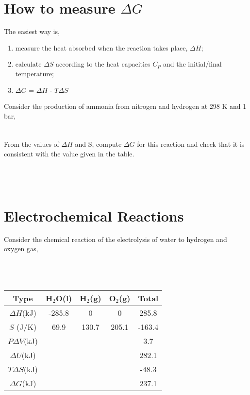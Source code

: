 \section{How to measure $\Delta{G}$}
The easiest way is,
\begin{enumerate}
\item measure the heat absorbed when the reaction takes place, $\Delta{H}$;
\item calculate $\Delta{S}$ according to the heat capacities $C_P$ and the initial/final temperature;
\item $\Delta{G}$ = $\Delta{H}$ - $T\Delta{S}$
\end{enumerate}
Consider the production of ammonia from nitrogen and hydrogen at 298 K and 1 bar, \\
\\\\
From the values of $\Delta{H}$ and S, compute $\Delta{G}$ for this reaction and check that it is consistent with the value given in the table.\\\\\\\\


\section{Electrochemical Reactions}
Consider the chemical reaction of the electrolysis of water to hydrogen and oxygen gas,\\\\
\\\\
\begin{tabular}{|c | c | c | c | c |}
\hline
Type                 &  H$_2$O(l)& H$_2$(g)& O$_2$(g)&   Total  \\\hline
$\Delta{H}$(kJ)      &  -285.8   &    0    &   0     &   285.8  \\\hline
$S$ (J/K)            &    69.9   & 130.7   & 205.1   &  -163.4  \\\hline
$P\Delta{V}$(kJ)     &           &         &         &     3.7  \\\hline
$\Delta{U}$(kJ)      &           &         &         &   282.1   \\\hline
$T\Delta{S}$(kJ)     &           &         &         &   -48.3  \\\hline
$\Delta{G}$(kJ)      &           &         &         &   237.1  \\\hline
\end{tabular}

